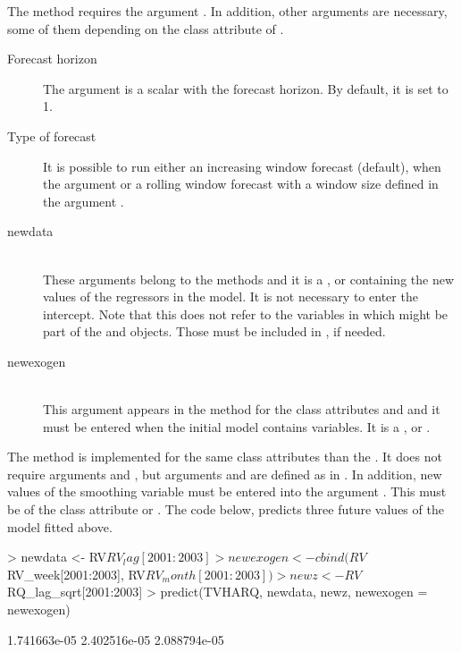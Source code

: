 The  method requires the argument . In addition, other arguments are necessary, some of them depending on the class attribute of .

\begin{description}

\item[Forecast horizon]
The argument  is a scalar with the forecast horizon. By default, it is set to 1.
\item[Type of forecast]
It is possible to run either an increasing window forecast (default), when the argument  or a rolling window forecast with a window size defined in the argument .

\item[newdata]\hfill\\
These arguments belong to the  methods and it is a ,  or  containing the new values of the regressors in the model. It is not necessary to enter the intercept. Note that this  does not refer to the variables in  which might be part of the  and  objects. Those must be included in , if needed.

\item[newexogen]\hfill\\
This argument appears in the  method for the class attributes  and  and it must be entered when the initial model contains  variables. It is a ,  or .
\end{description}

The  method is implemented for the same class attributes than the . It does not require arguments  and , but arguments  and  are defined as in . In addition, new values of the smoothing variable must be entered into the argument . This must be of the class attribute  or . The code below, predicts three future values of the  model fitted above.

\begin{Schunk}
\begin{Sinput}
> newdata <- RV$RV_lag[2001:2003]
> newexogen <- cbind(RV$RV_week[2001:2003], RV$RV_month[2001:2003])
> newz <- RV$RQ_lag_sqrt[2001:2003]
> predict(TVHARQ, newdata, newz, newexogen = newexogen)
\end{Sinput}
\begin{Soutput}
[1] 1.741663e-05 2.402516e-05 2.088794e-05
\end{Soutput}
\end{Schunk}
 
